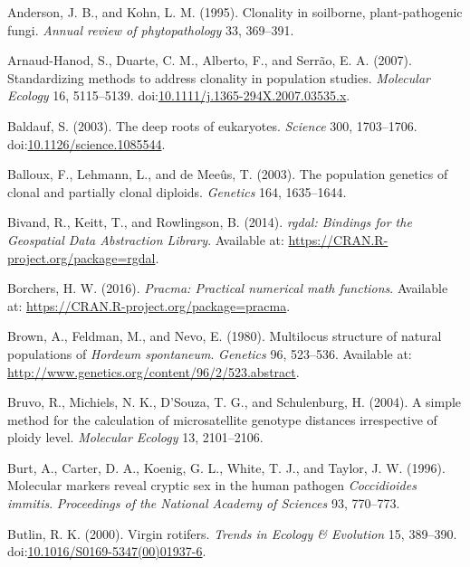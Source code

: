 \documentclass[double,12pt]{beavtex}
\begin{document}
  \hypertarget{ref-anderson1995clonality}{}
  Anderson, J. B., and Kohn, L. M. (1995). Clonality in soilborne,
  plant-pathogenic fungi. \emph{Annual review of phytopathology} 33,
  369--391.
  
  \hypertarget{ref-arnaud2007standardizing}{}
  Arnaud-Hanod, S., Duarte, C. M., Alberto, F., and Serrão, E. A. (2007).
  Standardizing methods to address clonality in population studies.
  \emph{Molecular Ecology} 16, 5115--5139.
  doi:\href{https://doi.org/10.1111/j.1365-294X.2007.03535.x}{10.1111/j.1365-294X.2007.03535.x}.
  
  \hypertarget{ref-baldauf2003deep}{}
  Baldauf, S. (2003). The deep roots of eukaryotes. \emph{Science} 300,
  1703--1706.
  doi:\href{https://doi.org/10.1126/science.1085544}{10.1126/science.1085544}.
  
  \hypertarget{ref-balloux2003population}{}
  Balloux, F., Lehmann, L., and de Meeûs, T. (2003). The population
  genetics of clonal and partially clonal diploids. \emph{Genetics} 164,
  1635--1644.
  
  \hypertarget{ref-bivand2014rgdal}{}
  Bivand, R., Keitt, T., and Rowlingson, B. (2014). \emph{rgdal: Bindings
  for the Geospatial Data Abstraction Library}. Available at:
  \url{https://CRAN.R-project.org/package=rgdal}.
  
  \hypertarget{ref-borchers2016pracma}{}
  Borchers, H. W. (2016). \emph{Pracma: Practical numerical math
  functions}. Available at:
  \url{https://CRAN.R-project.org/package=pracma}.
  
  \hypertarget{ref-brown1980multilocus}{}
  Brown, A., Feldman, M., and Nevo, E. (1980). Multilocus structure of
  natural populations of \emph{Hordeum spontaneum}. \emph{Genetics} 96,
  523--536. Available at:
  \url{http://www.genetics.org/content/96/2/523.abstract}.
  
  \hypertarget{ref-bruvo2004simple}{}
  Bruvo, R., Michiels, N. K., D'Souza, T. G., and Schulenburg, H. (2004).
  A simple method for the calculation of microsatellite genotype distances
  irrespective of ploidy level. \emph{Molecular Ecology} 13, 2101--2106.
  
  \hypertarget{ref-burt1996molecular}{}
  Burt, A., Carter, D. A., Koenig, G. L., White, T. J., and Taylor, J. W.
  (1996). Molecular markers reveal cryptic sex in the human pathogen
  \emph{Coccidioides immitis}. \emph{Proceedings of the National Academy
  of Sciences} 93, 770--773.
  
  \hypertarget{ref-butlin2000virgin}{}
  Butlin, R. K. (2000). Virgin rotifers. \emph{Trends in Ecology \&
  Evolution} 15, 389--390.
  doi:\href{https://doi.org/10.1016/S0169-5347(00)01937-6}{10.1016/S0169-5347(00)01937-6}.
  
\end{document}
